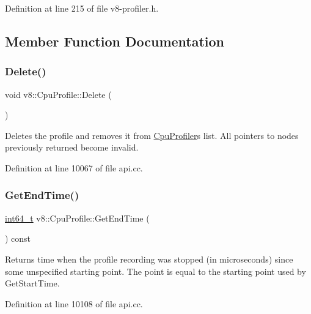 Definition at line 215 of file v8-\/profiler.\+h.



\subsection{Member Function Documentation}
\mbox{\label{classv8_1_1CpuProfile_a70c93f0c14d07a7e1bad42ee95665ca0}} 
\subsubsection{\texorpdfstring{Delete()}{Delete()}}
{\footnotesize\ttfamily void v8\+::\+Cpu\+Profile\+::\+Delete (\begin{DoxyParamCaption}{ }\end{DoxyParamCaption})}

Deletes the profile and removes it from \mbox{\hyperlink{classv8_1_1CpuProfiler}{Cpu\+Profiler}}\textquotesingle{}s list. All pointers to nodes previously returned become invalid. 

Definition at line 10067 of file api.\+cc.

\mbox{\label{classv8_1_1CpuProfile_a56f1dce6cc312c207d58131bde5c8fb8}} 
\subsubsection{\texorpdfstring{Get\+End\+Time()}{GetEndTime()}}
{\footnotesize\ttfamily \mbox{\hyperlink{classint64__t}{int64\+\_\+t}} v8\+::\+Cpu\+Profile\+::\+Get\+End\+Time (\begin{DoxyParamCaption}{ }\end{DoxyParamCaption}) const}

Returns time when the profile recording was stopped (in microseconds) since some unspecified starting point. The point is equal to the starting point used by Get\+Start\+Time. 

Definition at line 10108 of file api.\+cc.

\mbox{\label{classv8_1_1CpuProfile_a796377a4fae5c5724effb389ae8d19f8}} 
